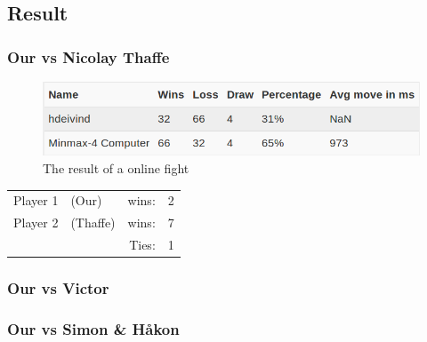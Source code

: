 \documentclass[12pt, a4paper]{article}
\begin{document}
\subsection{Result}
\subsubsection{Our vs Nicolay Thaffe}

\begin{figure}[h]

\includegraphics[width=19cm]{thaffe100.png}
\caption{The result of a online fight}
\label{figure4}

\end{figure}


  \begin{tabular}{| l  l  r l |}
    \hline
 	Player 1 & (Our) & wins: & 2 \\
 	Player 2 & (Thaffe) & wins: & 7 \\
 	& &  Ties: & 1 \\
    \hline
  \end{tabular}

\subsubsection{Our vs Victor}

\subsubsection{Our vs Simon \& Håkon}
\end{document}
